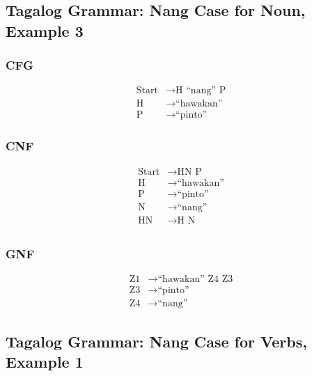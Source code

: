 \newpage
\subsection{Tagalog Grammar: Nang Case for Noun, Example 3}
\subsubsection{CFG}
\begin{equation*}
    \begin{aligned}
        \text{Start}   & \rightarrow \text{H “nang” P}   \\
        \text{H} & \rightarrow \text{“hawakan”} \\
        \text{P} & \rightarrow \text{“pinto”}
    \end{aligned}
\end{equation*}

\subsubsection{CNF}
\begin{equation*}
    \begin{aligned}
        \text{Start}   & \rightarrow \text{HN P}   \\
        \text{H} & \rightarrow \text{“hawakan”} \\
        \text{P} & \rightarrow \text{“pinto”} \\
        \text{N} & \rightarrow \text{“nang”} \\
        \text{HN} & \rightarrow \text{H N} \\
    \end{aligned}
\end{equation*}

\subsubsection{GNF}
\begin{equation*}
    \begin{aligned}
        \text{Z1}   & \rightarrow \text{“hawakan” Z4 Z3}   \\
        \text{Z3} & \rightarrow \text{“pinto”} \\
        \text{Z4} & \rightarrow \text{“nang”}
    \end{aligned}
\end{equation*}

\newpage
\subsection{Tagalog Grammar: Nang Case for Verbs, Example 1}
